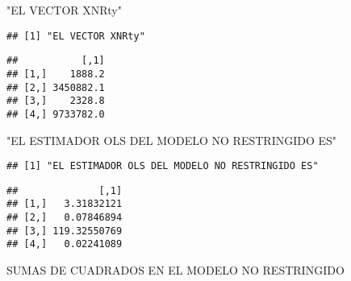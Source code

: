 \documentclass[
]{article}
\newenvironment{Shaded}{\begin{snugshade}}{\end{snugshade}}
\newcommand{\DataTypeTok}[1]{\textcolor[rgb]{0.13,0.29,0.53}{#1}}
\newcommand{\KeywordTok}[1]{\textcolor[rgb]{0.13,0.29,0.53}{\textbf{#1}}}
\newcommand{\NormalTok}[1]{#1}
\newcommand{\OperatorTok}[1]{\textcolor[rgb]{0.81,0.36,0.00}{\textbf{#1}}}
\newcommand{\StringTok}[1]{\textcolor[rgb]{0.31,0.60,0.02}{#1}}
\begin{document}
\begin{Shaded}
\begin{Highlighting}[]
\StringTok{"EL VECTOR XNRty"}
\end{Highlighting}
\end{Shaded}

\begin{verbatim}
## [1] "EL VECTOR XNRty"
\end{verbatim}

\begin{Shaded}
\end{Shaded}

\begin{verbatim}
##           [,1]
## [1,]    1888.2
## [2,] 3450882.1
## [3,]    2328.8
## [4,] 9733782.0
\end{verbatim}

\begin{Shaded}
\begin{Highlighting}[]
\StringTok{"EL ESTIMADOR OLS DEL MODELO NO RESTRINGIDO ES"}
\end{Highlighting}
\end{Shaded}

\begin{verbatim}
## [1] "EL ESTIMADOR OLS DEL MODELO NO RESTRINGIDO ES"
\end{verbatim}

\begin{Shaded}
\end{Shaded}

\begin{verbatim}
##              [,1]
## [1,]   3.31832121
## [2,]   0.07846894
## [3,] 119.32550769
## [4,]   0.02241089
\end{verbatim}

SUMAS DE CUADRADOS EN EL MODELO NO RESTRINGIDO

\begin{Shaded}
\end{Shaded}
\end{document}
